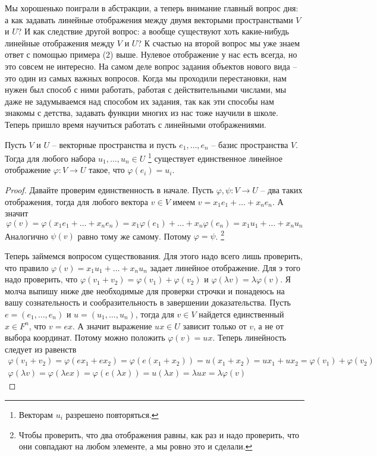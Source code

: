 Мы хорошенько поиграли в абстракции, а теперь внимание главный вопрос дня: а как задавать линейные отображения между двумя векторыми пространствами $V$ и $U$?
И как следствие другой вопрос: а вообще существуют хоть какие-нибудь линейные отображения между $V$ и $U$?
К счастью на второй вопрос мы уже знаем ответ с помощью примера (2) выше.
Нулевое отображение у нас есть всегда, но это совсем не интересно.
На самом деле вопрос задания объектов нового вида -- это один из самых важных вопросов.
Когда мы проходили перестановки, нам нужен был способ с ними работать, работая с действительными числами, мы даже не задумываемся над способом их задания, так как эти способы нам знакомы с детства, задавать функции многих из нас тоже научили в школе.
Теперь пришло время научиться работать с линейными отображениями.

\begin{claim}
\label{claim::LinMapExist}
Пусть $V$ и $U$ -- векторные пространства и пусть $e_1,\ldots,e_n$ -- базис пространства $V$.
Тогда для любого набора $u_1,\ldots,u_n\in U$%
\footnote{Векторам $u_i$ разрешено повторяться.}
существует единственное линейное отображение $\varphi\colon V\to U$ такое, что $\varphi(e_i) = u_i$.
\end{claim}
\begin{proof}

Давайте проверим единственность в начале.
Пусть $\varphi,\psi\colon V\to U$ -- два таких отображения, тогда для любого вектора $v\in V$ имеем $v = x_1 e_1 + \ldots + x_n e_n$.
А значит
\[
\varphi(v) = \varphi(x_1 e_1 + \ldots + x_n e_n) = x_1 \varphi(e_1) + \ldots + x_n \varphi(e_n) = x_1 u_1 + \ldots + x_n u_n
\]
Аналогично $\psi(v)$ равно тому же самому.
Потому $\varphi = \psi$.%
\footnote{Чтобы проверить, что два отображения равны, как раз и надо проверить, что они совпадают на любом элементе, а мы ровно это и сделали.}

Теперь займемся вопросом существования.
Для этого надо всего лишь проверить, что правило $\varphi(v) =  x_1 u_1 + \ldots + x_n u_n$ задает линейное отображение.
Для э того надо проверить, что $\varphi(v_1 + v_2) = \varphi(v_1) + \varphi(v_2)$ и $\varphi(\lambda v) = \lambda \varphi(v)$.
Я молча выпишу ниже две необходимые для проверки строчки и понадеюсь на вашу сознательность и сообразительность в завершении доказательства.
Пусть $e = (e_1,\ldots,e_n)$ и $u = (u_1,\ldots, u_n)$, тогда для $v\in V$ найдется единственный $x\in F^n$, что $v = ex$.
А значит выражение $ux\in U$ зависит только от $v$, а не от выбора координат.
Потому можно положить $\varphi(v) = ux$.
Теперь линейность следует из равенств
\begin{gather*}
\varphi(v_1 + v_2) = \varphi(ex_1 + ex_2) = \varphi(e(x_1 + x_2)) = u(x_1 + x_2) = u x_1 + ux_2 = \varphi(v_1) + \varphi(v_2)\\
\varphi(\lambda v) = \varphi(\lambda ex) = \varphi(e(\lambda x)) = u (\lambda x) = \lambda u x = \lambda \varphi(v)
\end{gather*}
\end{proof}

